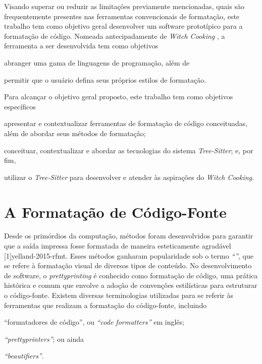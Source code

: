 \documentclass
 [11pt,a4paper,english,brazil,openright,sumario=tradicional,twoside]
 {abntex2}
\newcommand{\treesitter}{\textit{Tree-Sitter}\xspace}
\newcommand{\witchcooking}{\textit{Witch Cooking}\xspace}
\begin{document}
 Visando superar ou reduzir as limitações previamente mencionadas, quais são
 frequentemente presentes nas ferramentas convencionais de formatação, este
 trabalho tem como objetivo geral desenvolver um software prototípico para a
 formatação de código. Nomeada antecipadamente de \witchcooking
 \cite{silva-2023-witch}, a ferramenta a ser desenvolvida tem como objetivos
 \begin{inparaenum}
  \item abranger uma gama de linguagens de programação, além de
  \item permitir que o usuário defina seus próprios estilos de formatação.
 \end{inparaenum}

 Para alcançar o objetivo geral proposto, este trabalho tem como objetivos
 específicos
 \begin{inparaenum}
  \item apresentar e contextualizar ferramentas de formatação de código
        conceituadas, além de abordar seus métodos de formatação;
  \item conceituar, contextualizar e abordar as tecnologias do sistema
        \treesitter; e, por fim,
  \item utilizar o \treesitter para desenvolver e atender às aspirações do
        \witchcooking.
 \end{inparaenum}


 \chapter{A Formatação de Código-Fonte}

 Desde os primórdios da computação, métodos foram desenvolvidos para garantir
 que a saída impressa fosse formatada de maneira esteticamente agradável
 [1]{yelland-2015-rfmt}. Esses métodos ganharam
 popularidade sob o termo \textit{``''}, que se refere à
 formatação visual de diversos tipos de conteúdo. No desenvolvimento de
 software, o \textit{prettyprinting} é conhecido como formatação de código, uma
 prática histórica e comum que envolve a adoção de convenções estilísticas para
 estruturar o código-fonte. Existem diversas terminologias utilizadas para se
 referir às ferramentas que realizam a formatação do código-fonte, incluindo
 \begin{inparaenum}
  \item ``formatadores de código'', ou \textit{``code formatters''} em inglês;
  \item \textit{``prettyprinters''}; ou ainda
  \item \textit{``beautifiers''}.
 \end{inparaenum}
\end{document}

